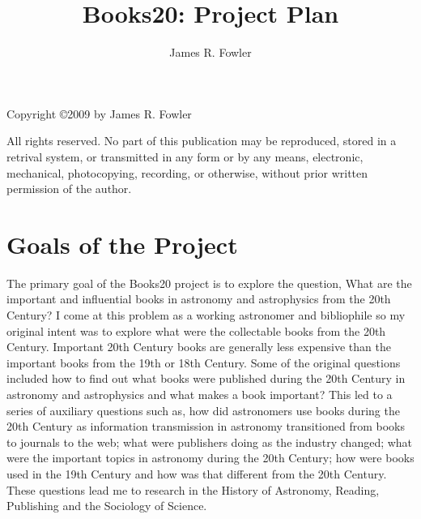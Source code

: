 \documentclass{article}
\begin{document}
\title{Books20: Project Plan}
\author{James R. Fowler}
\maketitle
\vfil\eject

\vspace*{5 in}
Copyright \copyright 2009 by James R. Fowler

All rights reserved. No part of this publication may be
reproduced, stored in a retrival system, or transmitted
in any form or by any means, electronic, mechanical,
photocopying, recording, or otherwise, without prior written
permission of the author.

\vfil\eject

%
%
\section{Goals of the Project}
The primary goal of the Books20 project is to explore the question,
What are the important and influential books in astronomy and
astrophysics from the 20th Century? I come at this problem as a
working astronomer and bibliophile so my original intent was to
explore what were the collectable books from the 20th
Century. Important 20th Century books are generally less expensive
than the important books from the 19th or 18th Century.  Some of the
original questions included how to find out what books were published
during the 20th Century in astronomy and astrophysics and what makes a
book important? This led to a series of auxiliary questions such as,
how did astronomers use books during the 20th Century as information
transmission in astronomy transitioned from books to journals to the
web; what were publishers doing as the industry changed; what were the
important topics in astronomy during the 20th Century; how were books
used in the 19th Century and how was that different from the 20th
Century.  These questions lead me to research in the History of
Astronomy, Reading, Publishing and the Sociology of Science.
\end{document}
